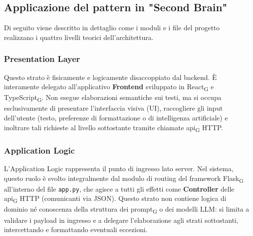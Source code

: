 \documentclass[11pt,a4paper]{article}
\newcommand{\gls}[1]{#1\textsubscript{G}}
\begin{document}

\subsection{Applicazione del pattern in "Second Brain"}
Di seguito viene descritto in dettaglio come i moduli e i file del progetto realizzano i quattro livelli teorici dell'architettura.


\subsubsection{Presentation Layer}
Questo strato è fisicamente e logicamente disaccoppiato dal backend. È interamente delegato all'applicativo \textbf{Frontend} sviluppato in \gls{React} e \gls{TypeScript}. Non esegue elaborazioni semantiche sui testi, ma si occupa esclusivamente di presentare l'interfaccia visiva (UI), raccogliere gli input dell'utente (testo, preferenze di formattazione o di intelligenza artificiale) e inoltrare tali richieste al livello sottostante tramite chiamate \gls{api} HTTP.

\subsubsection{Application Logic}
L'Application Logic rappresenta il punto di ingresso lato server. Nel sistema, questo ruolo è svolto integralmente dal modulo di routing del framework \gls{Flask} all'interno del file \texttt{app.py}, che agisce a tutti gli effetti come \textbf{Controller} delle \gls{api} HTTP (comunicanti via JSON). Questo strato non contiene logica di dominio né conoscenza della struttura dei \gls{prompt} o dei modelli LLM: si limita a validare i payload in ingresso e a delegare l'elaborazione agli strati sottostanti, intercettando e formattando eventuali eccezioni.
\end{document}

